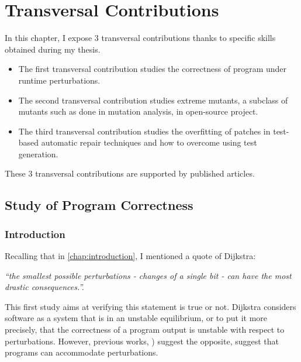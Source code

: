 \chapter{Transversal Contributions}
\label{chap:transversal-contributions}

\begin{chaptersummary}
	In this chapter, I expose 3 transversal contributions thanks to specific skills obtained during my thesis.
	\begin{itemize}
		\item \cite{Danglot2018} The first transversal contribution studies the correctness of program under runtime perturbations.
		\item \cite{descartes} The second transversal contribution studies extreme mutants, \eg a subclass of mutants such as done in mutation analysis, in open-source project. 
		\item \cite{Yu2019} The third transversal contribution studies the overfitting of patches in test-based automatic repair techniques and how to overcome using test generation.
	\end{itemize}
	These 3 transversal contributions are supported by published articles.
\end{chaptersummary}

\minitoc

\graphicspath{{.}{chapitres/transversal_contributions/}}

\section{Study of Program Correctness}
\label{sec:transversal-contributions:correctness}

\subsection{Introduction}
\label{subsec:transversal-contributions:correctness:introduction}

Recalling that in \autoref{chap:introduction}, I mentioned a quote of Dijkstra:
\begin{center}
	\emph{``the smallest possible perturbations - \ie changes of a single bit - can have the most drastic consequences.''.}
\end{center}

This first study aims at verifying this statement is true or not.
Dijkstra considers software as a system that is in an unstable equilibrium, or to put it more precisely, that the correctness of a program output is unstable with respect to perturbations.
However, previous works, \eg\cite{Rinard:2005:EAE:1094855.1094866,Li2007Correctness}) suggest the opposite, \ie suggest that programs can accommodate perturbations.


